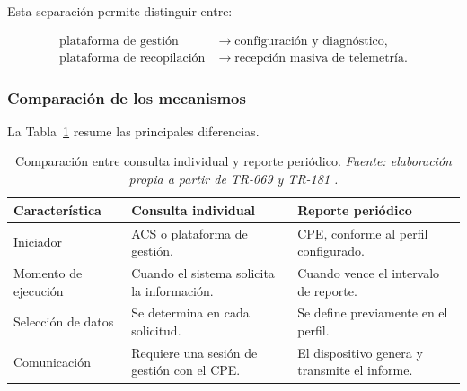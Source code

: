 Esta separación permite distinguir entre:

\[
\begin{aligned}
    \text{plataforma de gestión}
    &\longrightarrow
    \text{configuración y diagnóstico},\\
    \text{plataforma de recopilación}
    &\longrightarrow
    \text{recepción masiva de telemetría}.
\end{aligned}
\]


\subsubsection*{Comparación de los mecanismos}

La Tabla~\ref{tab:consulta-individual-reporte-periodico} resume las
principales diferencias.

\begin{table}[H]
    \centering
    \scriptsize
    \renewcommand{\arraystretch}{1.35}

    \caption[Consulta individual y reporte periódico.]
    {Comparación entre consulta individual y reporte periódico.
    \textit{Fuente: elaboración propia a partir de TR-069 y TR-181
    \cite{bbf_tr069,bbf_tr181}.}}

    \label{tab:consulta-individual-reporte-periodico}

    \begin{tabular}{
        p{}
        p{}
        p{}
    }
        \hline

        \textbf{Característica}
        &
        \textbf{Consulta individual}
        &
        \textbf{Reporte periódico}
        \\

        \hline

        Iniciador
        &
        ACS o plataforma de gestión.
        &
        CPE, conforme al perfil configurado.
        \\

        Momento de ejecución
        &
        Cuando el sistema solicita la información.
        &
        Cuando vence el intervalo de reporte.
        \\

        Selección de datos
        &
        Se determina en cada solicitud.
        &
        Se define previamente en el perfil.
        \\

        Comunicación
        &
        Requiere una sesión de gestión con el CPE.
        &
        El dispositivo genera y transmite el informe.
        \\


\end{tabular}
\end{table}
